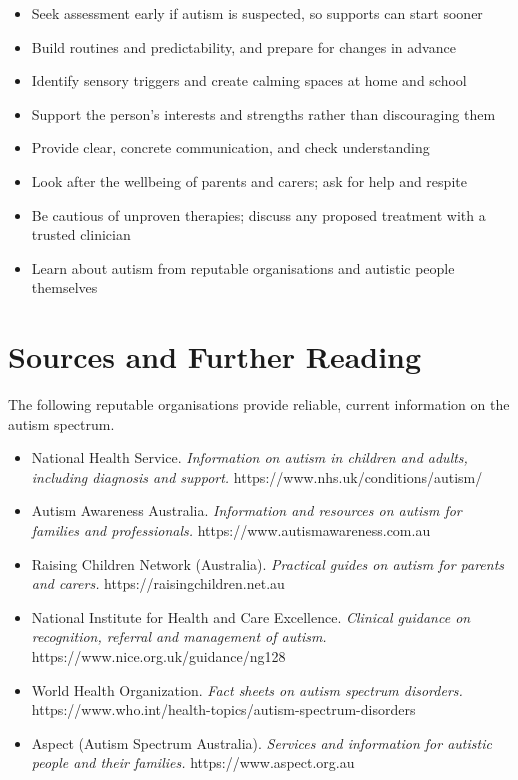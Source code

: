 \begin{itemize}
    \item Seek assessment early if autism is suspected, so supports can start sooner
    \item Build routines and predictability, and prepare for changes in advance
    \item Identify sensory triggers and create calming spaces at home and school
    \item Support the person's interests and strengths rather than discouraging them
    \item Provide clear, concrete communication, and check understanding
    \item Look after the wellbeing of parents and carers; ask for help and respite
    \item Be cautious of unproven therapies; discuss any proposed treatment with a trusted clinician
    \item Learn about autism from reputable organisations and autistic people themselves
\end{itemize}

\section*{Sources and Further Reading}
The following reputable organisations provide reliable, current information on the autism spectrum.

\begin{itemize}
    \item National Health Service. \textit{Information on autism in children and adults, including diagnosis and support.} https://www.nhs.uk/conditions/autism/
    \item Autism Awareness Australia. \textit{Information and resources on autism for families and professionals.} https://www.autismawareness.com.au
    \item Raising Children Network (Australia). \textit{Practical guides on autism for parents and carers.} https://raisingchildren.net.au
    \item National Institute for Health and Care Excellence. \textit{Clinical guidance on recognition, referral and management of autism.} https://www.nice.org.uk/guidance/ng128
    \item World Health Organization. \textit{Fact sheets on autism spectrum disorders.} https://www.who.int/health-topics/autism-spectrum-disorders
    \item Aspect (Autism Spectrum Australia). \textit{Services and information for autistic people and their families.} https://www.aspect.org.au
\end{itemize}
